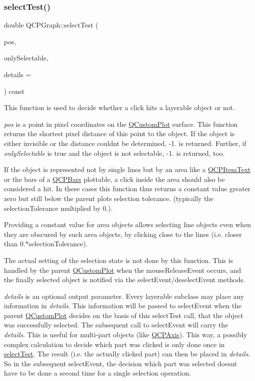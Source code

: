 \subsubsection{\texorpdfstring{select\+Test()}{selectTest()}}
{\footnotesize\ttfamily double Q\+C\+P\+Graph\+::select\+Test (\begin{DoxyParamCaption}\item[{const Q\+PointF \&}]{pos,  }\item[{bool}]{only\+Selectable,  }\item[{Q\+Variant $\ast$}]{details = {} }\end{DoxyParamCaption}) const\hspace{0.3cm}{\ttfamily [virtual]}}

This function is used to decide whether a click hits a layerable object or not.

{\itshape pos} is a point in pixel coordinates on the \hyperlink{class_q_custom_plot}{Q\+Custom\+Plot} surface. This function returns the shortest pixel distance of this point to the object. If the object is either invisible or the distance couldn\textquotesingle{}t be determined, -\/1. is returned. Further, if {\itshape only\+Selectable} is true and the object is not selectable, -\/1. is returned, too.

If the object is represented not by single lines but by an area like a \hyperlink{class_q_c_p_item_text}{Q\+C\+P\+Item\+Text} or the bars of a \hyperlink{class_q_c_p_bars}{Q\+C\+P\+Bars} plottable, a click inside the area should also be considered a hit. In these cases this function thus returns a constant value greater zero but still below the parent plot\textquotesingle{}s selection tolerance. (typically the selection\+Tolerance multiplied by 0.).

Providing a constant value for area objects allows selecting line objects even when they are obscured by such area objects, by clicking close to the lines (i.\+e. closer than 0.$\ast$selection\+Tolerance).

The actual setting of the selection state is not done by this function. This is handled by the parent \hyperlink{class_q_custom_plot}{Q\+Custom\+Plot} when the mouse\+Release\+Event occurs, and the finally selected object is notified via the select\+Event/deselect\+Event methods.

{\itshape details} is an optional output parameter. Every layerable subclass may place any information in {\itshape details}. This information will be passed to select\+Event when the parent \hyperlink{class_q_custom_plot}{Q\+Custom\+Plot} decides on the basis of this select\+Test call, that the object was successfully selected. The subsequent call to select\+Event will carry the {\itshape details}. This is useful for multi-\/part objects (like \hyperlink{class_q_c_p_axis}{Q\+C\+P\+Axis}). This way, a possibly complex calculation to decide which part was clicked is only done once in \hyperlink{class_q_c_p_graph_a36011c34aca4f7a477de25961e2f6c13}{select\+Test}. The result (i.\+e. the actually clicked part) can then be placed in {\itshape details}. So in the subsequent select\+Event, the decision which part was selected doesn\textquotesingle{}t have to be done a second time for a single selection operation.

